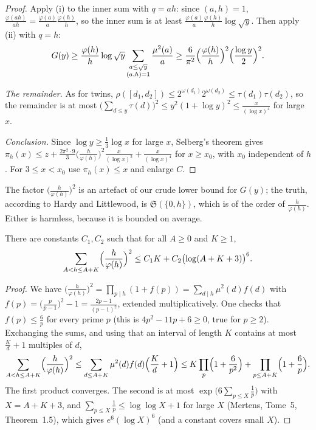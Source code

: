 \begin{proof}
Apply (i) to the inner sum with $q=ah$: since $(a,h)=1$, $\frac{\varphi(ah)}{ah}=\frac{\varphi(a)}a\frac{\varphi(h)}h$, so the inner sum is at least
$\frac{\varphi(a)}a\frac{\varphi(h)}h\log\sqrt y$. Then apply (ii) with $q=h$:
\[
G(y)\ge\frac{\varphi(h)}h\log\sqrt y\sum_{\substack{a\le\sqrt y\\(a,h)=1}}\frac{\mu^2(a)}a\ge\frac6{\pi^2}\Bigl(\frac{\varphi(h)}h\Bigr)^2\Bigl(\frac{\log y}2\Bigr)^2.
\]

\emph{The remainder.} As for twins, $\rho([d_1,d_2])\le2^{\omega(d_1)}2^{\omega(d_2)}\le\tau(d_1)\tau(d_2)$, so the remainder is at most
$\bigl(\sum_{d\le y}\tau(d)\bigr)^2\le y^2(1+\log y)^2\le\frac x{(\log x)^4}$ for large $x$.

\emph{Conclusion.} Since $\log y\ge\frac13\log x$ for large $x$, Selberg's theorem gives
$\pi_h(x)\le z+\frac{2\pi^2\cdot9}3\bigl(\frac h{\varphi(h)}\bigr)^2\frac x{(\log x)^2}+\frac x{(\log x)^4}$ for $x\ge x_0$, with $x_0$ independent of $h$. For
$3\le x<x_0$ use $\pi_h(x)\le x$ and enlarge $C$.
\end{proof}

The factor $\bigl(\frac h{\varphi(h)}\bigr)^2$ is an artefact of our crude lower bound for $G(y)$; the truth, according to Hardy and Littlewood, is
$\mathfrak S(\{0,h\})$, which is of the order of $\frac h{\varphi(h)}$. Either is harmless, because it is bounded on average.

\begin{lemma}\label{lem:hphi}
There are constants $C_1,C_2$ such that for all $A\ge0$ and $K\ge1$,
\[
\sum_{A<h\le A+K}\Bigl(\frac h{\varphi(h)}\Bigr)^2\le C_1K+C_2\bigl(\log(A+K+3)\bigr)^6.
\]
\end{lemma}
\begin{proof}
We have $\bigl(\frac h{\varphi(h)}\bigr)^2=\prod_{p\mid h}(1+f(p))=\sum_{d\mid h}\mu^2(d)f(d)$ with $f(p)=\bigl(\frac p{p-1}\bigr)^2-1=\frac{2p-1}{(p-1)^2}$, extended
multiplicatively. One checks that $f(p)\le\frac6p$ for every prime $p$ (this is $4p^2-11p+6\ge0$, true for $p\ge2$). Exchanging the sums, and using
that an interval of length $K$ contains at most $\frac Kd+1$ multiples of $d$,
\[
\sum_{A<h\le A+K}\Bigl(\frac h{\varphi(h)}\Bigr)^2\le\sum_{d\le A+K}\mu^2(d)f(d)\Bigl(\frac Kd+1\Bigr)\le K\prod_p\Bigl(1+\frac6{p^2}\Bigr)+\prod_{p\le A+K}\Bigl(1+\frac6p\Bigr).
\]
The first product converges. The second is at most $\exp\bigl(6\sum_{p\le X}\frac1p\bigr)$ with $X=A+K+3$, and $\sum_{p\le X}\frac1p\le\log\log X+1$ for large $X$
(Mertens, Tome~5, Theorem~1.5), which gives $e^6(\log X)^6$ (and a constant covers small $X$).
\end{proof}


